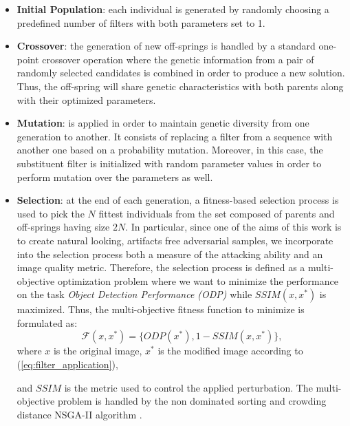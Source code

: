 \begin{itemize}
    \item {\bf Initial Population}: each individual is generated by randomly choosing a predefined number of filters with both parameters set to 1. 
    \item { \bf Crossover}: the generation of new off-springs is handled by a standard one-point crossover operation where the genetic information from 
    a pair of randomly selected candidates is combined in order to produce a new solution. Thus, the off-spring will share genetic characteristics with both parents along with their optimized parameters.
    \item {\bf Mutation}: is applied in order to maintain genetic diversity from one generation to another. It consists of replacing a filter from a sequence with another one based on a probability mutation. Moreover, in this case, the substituent filter is initialized with random parameter values in order to perform mutation over the parameters as well.
    \item {\bf Selection}: at the end of each generation, a fitness-based selection process is used to pick the $N$ fittest individuals from the set composed of parents and off-springs having size $2N$. 
    In particular, since one of the aims of this work is to create natural looking, artifacts free adversarial samples, we incorporate into the selection process both a measure of the attacking ability and an image quality metric. Therefore, the selection process is defined as a multi-objective optimization problem where we want to minimize the performance on the task  \textit{Object Detection Performance (ODP)}  while $SSIM(x, x^*)$  is maximized. Thus, the multi-objective fitness function to minimize is formulated as:
    \begin{equation} \label{eq:general_fitness}
       \mathcal{F}(x,x^*) = \{ ODP(x^*), 1-SSIM(x, x^*)\},
    \end{equation}
    where $x$ is the original image, $x^*$ is the modified image according to (\ref{eq:filter_application}), 

 and $SSIM$ is the metric used to control the applied perturbation. The multi-objective problem is handled by the non dominated sorting and crowding distance NSGA-II algorithm \cite{NSGA-II}.
\end{itemize}

